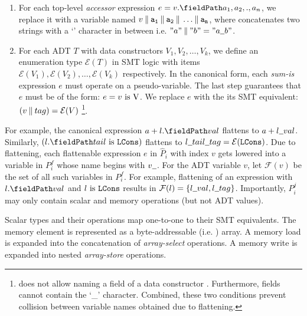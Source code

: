 \begin{enumerate}
\item For each top-level {\em accessor} expression $e = \prodAccess{v}{a_1,a_2,.,a_n}$, we replace it with a
variable named $v \mathbin\Vert{} {{\tt a_1}} \mathbin\Vert{} {{\tt a_2}} \mathbin\Vert{} \dots \mathbin\Vert{} {{\tt a_n}}$,
where \strcat{} concatenates two strings with a `\strsep{}' character in between i.e.
$"a" \strcat{} "b" = "a \strsep{} b"$.

\item For each ADT $T$ with data constructors $V_1,V_2,\dots,V_k$,
we define an enumeration type $\mathcal{E}(T)$ in SMT logic with items
$\mathcal{E}(V_1),\mathcal{E}(V_2),\dots,\mathcal{E}(V_k)$ respectively.
In the canonical form, each {\em sum-is} expression $e$ must operate on a pseudo-variable.
The last step guarantees that $e$ must be of the form: $e = v\ \mathrm{is}\ {\tt \textnormal{V}}$.
We replace $e$ with the its SMT equivalent: $(v \mathbin\Vert{} tag) = \mathcal{E}(V)$
\footnote{\SpecL{} does not allow naming a field of a data constructor .
Furthermore, fields cannot contain the `\_' character.
Combined, these two conditions prevent collision between variable names obtained due to flattening.}.
\end{enumerate}

For example, the canonical expression $a + \prodAccess{l}{val}$ flattens to $a + l \strsep{} val$.
Similarly, $(\sumIs{\prodAccess{l}{tail}}{LCons})$ flattens to $l \strsep{} tail \strsep{} tag = \mathcal{E}(\cons{LCons})$.
Due to flattening, each flattenable expression $e$ in $\hat{P}_i$ with index $v$ gets lowered
into a variable in $P_i^f$ whose name begins with $v \strsep$.
For the ADT variable $v$, let $\mathcal{F}(v)$ be the set of all such variables in $P_i^f$.
For example, flattening of an expression with $\prodAccess{l}{val}$ and $l\ \mathrm{is}\ {\tt LCons}$
results in $\mathcal{F}(l) = \{ l \strsep{} val, l \strsep tag \}$.
Importantly, $P_i^j$ may only contain scalar and memory operations (but not ADT values).

Scalar types and their operations map one-to-one to their SMT equivalents.
The memory element \mem{} is represented as a byte-addressable (i.e. ) array.
A memory load  is expanded into the concatenation of  {\em array-select} operations.
A memory write  is expanded into  nested {\em array-store} operations.

